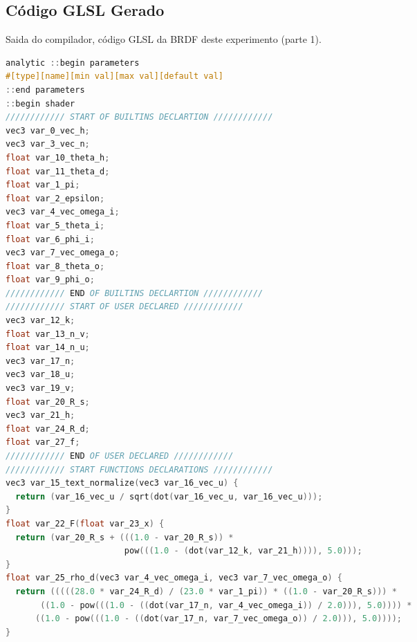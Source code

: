 \subsection{Código GLSL Gerado}
\begin{codigo}[H]
    \caption{\small Saida do compilador, código GLSL da BRDF deste experimento (parte 1). }
    \label{cod-ashikhmin-shirley-close-to-original-glsl-pt-1}
\begin{lstlisting}[language=C, inputencoding=utf8]
analytic ::begin parameters
#[type][name][min val][max val][default val]
::end parameters
::begin shader
//////////// START OF BUILTINS DECLARTION ////////////
vec3 var_0_vec_h;
vec3 var_3_vec_n;
float var_10_theta_h;
float var_11_theta_d;
float var_1_pi;
float var_2_epsilon;
vec3 var_4_vec_omega_i;
float var_5_theta_i;
float var_6_phi_i;
vec3 var_7_vec_omega_o;
float var_8_theta_o;
float var_9_phi_o;
//////////// END OF BUILTINS DECLARTION ////////////
//////////// START OF USER DECLARED ////////////
vec3 var_12_k;
float var_13_n_v;
float var_14_n_u;
vec3 var_17_n;
vec3 var_18_u;
vec3 var_19_v;
float var_20_R_s;
vec3 var_21_h;
float var_24_R_d;
float var_27_f;
//////////// END OF USER DECLARED ////////////
//////////// START FUNCTIONS DECLARATIONS ////////////
vec3 var_15_text_normalize(vec3 var_16_vec_u) {
  return (var_16_vec_u / sqrt(dot(var_16_vec_u, var_16_vec_u)));
}
float var_22_F(float var_23_x) {
  return (var_20_R_s + (((1.0 - var_20_R_s)) *
                        pow(((1.0 - (dot(var_12_k, var_21_h)))), 5.0)));
}
float var_25_rho_d(vec3 var_4_vec_omega_i, vec3 var_7_vec_omega_o) {
  return (((((28.0 * var_24_R_d) / (23.0 * var_1_pi)) * ((1.0 - var_20_R_s))) *
       ((1.0 - pow(((1.0 - ((dot(var_17_n, var_4_vec_omega_i)) / 2.0))), 5.0)))) *
      ((1.0 - pow(((1.0 - ((dot(var_17_n, var_7_vec_omega_o)) / 2.0))), 5.0))));
}
\end{lstlisting}
\end{codigo}


